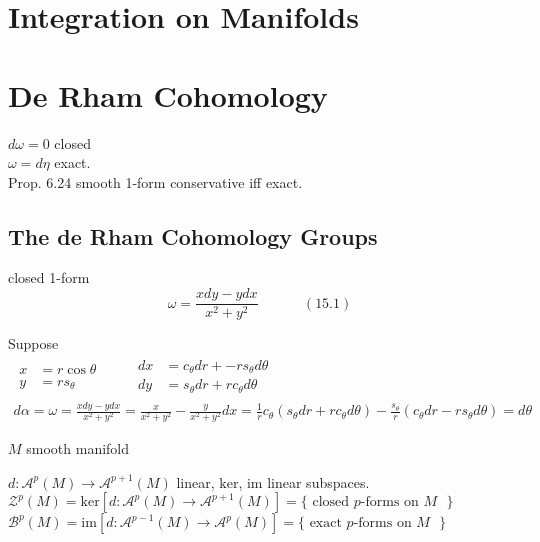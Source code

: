 \documentclass[twoside]{amsart}
\theoremstyle{plain}
\theoremstyle{definition}
\begin{document}
\section{Integration on Manifolds}



\section{De Rham Cohomology}

$d\omega = 0$ closed \\
$\omega = d\eta$ exact.   \\

Prop. 6.24 smooth 1-form conservative iff exact.

\subsection*{ The de Rham Cohomology Groups}

closed 1-form 
\begin{equation}
\omega = \frac{ x dy - y dx}{ x^2 + y^2 }  \quad \quad \quad \, (15.1)
\end{equation}

Suppose 
\[
\begin{gathered}
\begin{aligned}
  x & = r\cos{\theta} \\ 
  y & = r s_{\theta} 
\end{aligned} \quad \quad \, \begin{aligned}
  dx & = c_{\theta}dr + -r s_{\theta} d\theta \\ 
  dy & = s_{\theta} dr + rc_{\theta} d\theta
\end{aligned} \\
d\alpha = \omega = \frac{ x dy - y dx}{ x^2 + y^2 } = \frac{ x}{ x^2 + y^2 } - \frac{y}{x^2 + y^2} dx = \frac{1}{r} c_{\theta} ( s_{\theta} dr + rc_{\theta} d\theta ) - \frac{s_{\theta}}{r} ( c_{\theta} dr - rs_{\theta} d\theta) = d\theta 
\end{gathered}
\]

$M$ smooth manifold

$d: \mathcal{A}^p(M) \to \mathcal{A}^{p+1}(M)$ linear, $\text{ker}$, $\text{im}$ linear subspaces.  \\
$\mathcal{Z}^p(M) = \text{ker}{ [ d : \mathcal{A}^p(M) \to \mathcal{A}^{p+1}(M)] } = \lbrace \text{ closed $p$-forms on $M$ } \rbrace$ \\
$\mathcal{B}^p(M) = \text{im}{ [ d: \mathcal{A}^{p-1}(M) \to \mathcal{A}^p(M)]} = \lbrace \text{ exact $p$-forms on $M$ } \rbrace$
\end{document}

